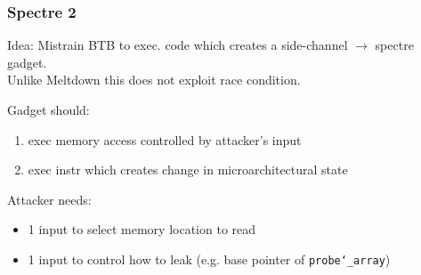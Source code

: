 \subsubsection{Spectre 2}
Idea: Mistrain BTB to exec. code which creates a side-channel $\xrightarrow{}$
spectre gadget.\\
Unlike Meltdown this does not exploit race condition.

Gadget should:\vspace{-1.5mm}
\begin{enumerate}
    \item exec memory access controlled by attacker's input
    \item exec instr which creates change in microarchitectural state
\end{enumerate}

Attacker needs:\vspace{-1.5mm}
\begin{itemize}
    \item 1 input to select memory location to read
    \item 1 input to control how to leak (e.g. base pointer of \texttt{probe\char`_array})
\end{itemize}
